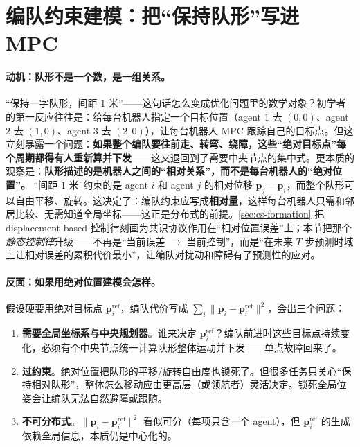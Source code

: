 \section{编队约束建模：把“保持队形”写进 MPC}
\label{sec:dmpc-formation}

\paragraph{动机：队形不是一个数，是一组关系。}
“保持一字队形，间距 $1$ 米”——这句话怎么变成优化问题里的数学对象？初学者的第一反应往往是：给每台机器人指定一个目标位置（agent $1$ 去 $(0,0)$、agent $2$ 去 $(1,0)$、agent $3$ 去 $(2,0)$），让每台机器人 MPC 跟踪自己的目标点。但这立刻暴露一个问题：\textbf{如果整个编队要往前走、转弯、绕障，这些“绝对目标点”每个周期都得有人重新算并下发}——这又退回到了需要中央节点的集中式。更本质的观察是：\textbf{队形描述的是机器人之间的“相对关系”，而不是每台机器人的“绝对位置”。} “间距 $1$ 米”约束的是 agent $i$ 和 agent $j$ 的相对位移 $\mathbf{p}_j-\mathbf{p}_i$，而整个队形可以自由平移、旋转。这决定了：编队约束应写成\textbf{相对量}，这样每台机器人只需和邻居比较、无需知道全局坐标——这正是分布式的前提。\cref{sec:cs-formation} 把 displacement-based 控制律刻画为共识协议作用在“相对位置误差”上；本节把那个\emph{静态控制律}升级——不再是“当前误差 $\to$ 当前控制”，而是“在未来 $T$ 步预测时域上让相对误差的累积代价最小”，让编队对扰动和障碍有了预测性的应对。

\paragraph{反面：如果用绝对位置建模会怎样。}
假设硬要用绝对目标点 $\mathbf{p}_i^{\text{ref}}$，编队代价写成 $\sum_i\|\mathbf{p}_i-\mathbf{p}_i^{\text{ref}}\|^2$，会出三个问题：
\begin{enumerate}
  \item \textbf{需要全局坐标系与中央规划器}。谁来决定 $\mathbf{p}_i^{\text{ref}}$？编队前进时这些目标点持续变化，必须有个中央节点统一计算队形整体运动并下发——单点故障回来了。
  \item \textbf{过约束}。绝对位置把队形的平移/旋转自由度也锁死了。但很多任务只关心“保持相对队形”，整体怎么移动应由更高层（或领航者）灵活决定。锁死全局位姿会让编队无法自然避障或跟随。
  \item \textbf{不可分布式}。$\|\mathbf{p}_i-\mathbf{p}_i^{\text{ref}}\|^2$ 看似可分（每项只含一个 agent），但 $\mathbf{p}_i^{\text{ref}}$ 的生成依赖全局信息，本质仍是中心化的。
\end{enumerate}

